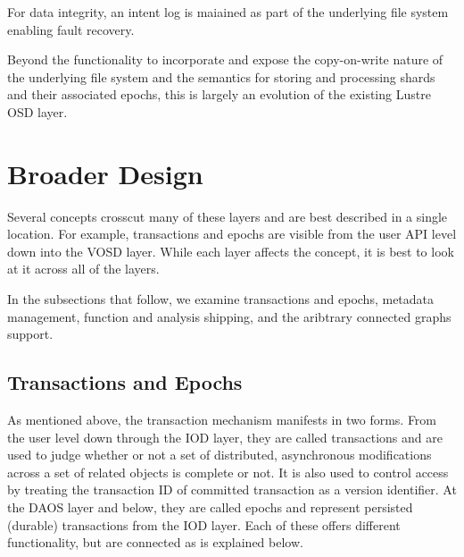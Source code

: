 \documentclass[conference]{IEEEtran}
\begin{document}
For data integrity, an intent log is maiained as part of the underlying file
system enabling fault recovery.

Beyond the functionality to incorporate and expose the copy-on-write nature
of the underlying file system and the semantics for storing and processing
shards and their associated epochs, this is largely an evolution of the
existing Lustre OSD layer.

\section{Broader Design}
\label{sec:broader}

Several concepts crosscut many of these layers and are best described in a
single location. For example, transactions and epochs are visible from the
user API level down into the VOSD layer. While each layer affects the concept,
it is best to look at it across all of the layers.

In the subsections that follow, we examine transactions and epochs, metadata
management, function and analysis shipping, and the aribtrary connected graphs
support.

\subsection{Transactions and Epochs}
\label{sec:transactions}

As mentioned above, the transaction mechanism manifests in two forms. From the
user level down through the IOD layer, they are called transactions and are
used to judge whether or not a set of distributed, asynchronous modifications
across a set of related objects is complete or not.  It is also used to control
access by treating the transaction ID of committed transaction as a version
identifier.  At the DAOS layer and below, they are called epochs and represent
persisted (durable) transactions from the IOD layer. Each of these offers
different functionality, but are connected as is explained below.
\end{document}
